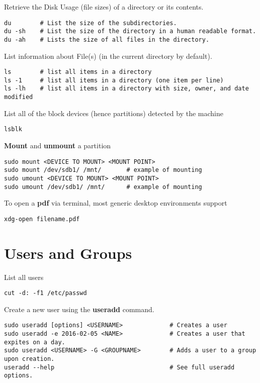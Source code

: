 Retrieve the Disk Usage (file sizes) of a directory or its contents.
\begin{lstlisting}
du        # List the size of the subdirectories.
du -sh    # List the size of the directory in a human readable format.
du -ah    # Lists the size of all files in the directory.
\end{lstlisting}

List information about File(s) (in the current directory by default).
\begin{lstlisting}
ls        # list all items in a directory
ls -1     # list all items in a directory (one item per line)
ls -lh    # list all items in a directory with size, owner, and date modified
\end{lstlisting}

List all of the block devices (hence partitions) detected by the machine
\begin{lstlisting}
lsblk
\end{lstlisting}

\textbf{Mount} and \textbf{unmount} a partition
\begin{lstlisting}
sudo mount <DEVICE TO MOUNT> <MOUNT POINT>
sudo mount /dev/sdb1/ /mnt/       # example of mounting
sudo umount <DEVICE TO MOUNT> <MOUNT POINT>
sudo umount /dev/sdb1/ /mnt/      # example of mounting
\end{lstlisting}


To open a \textbf{pdf} via terminal, most generic desktop environments support
\begin{lstlisting}
xdg-open filename.pdf
\end{lstlisting}





\section{Users and Groups}

List all users
\begin{lstlisting}
cut -d: -f1 /etc/passwd
\end{lstlisting}

Create a new user using the \textbf{useradd} command.
\begin{lstlisting}
sudo useradd [options] <USERNAME>             # Creates a user
sudo useradd -e 2016-02-05 <NAME>             # Creates a user that expites on a day.
sudo useradd <USERNAME> -G <GROUPNAME>        # Adds a user to a group upon creation.
useradd --help                                # See full useradd options.
\end{lstlisting}

